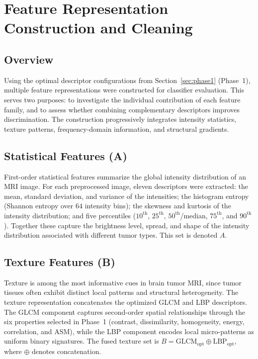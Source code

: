 \section{Feature Representation Construction and Cleaning}
\label{sec:features}

\subsection{Overview}

Using the optimal descriptor configurations from Section~\ref{sec:phase1}
(Phase~1), multiple feature representations were constructed for classifier
evaluation. This serves two purposes: to investigate the individual contribution
of each feature family, and to assess whether combining complementary descriptors
improves discrimination. The construction progressively integrates intensity
statistics, texture patterns, frequency-domain information, and structural
gradients.

\subsection{Statistical Features (A)}
\label{sec:feat_stats}

First-order statistical features summarize the global intensity distribution of
an MRI image. For each preprocessed image, eleven descriptors were extracted:
the mean, standard deviation, and variance of the intensities; the histogram
entropy (Shannon entropy over $64$ intensity bins); the skewness and kurtosis of
the intensity distribution; and five percentiles ($10^{\text{th}}$,
$25^{\text{th}}$, $50^{\text{th}}$/median, $75^{\text{th}}$, and
$90^{\text{th}}$). Together these capture the brightness level, spread, and shape
of the intensity distribution associated with different tumor types. This set is
denoted $A$.

\subsection{Texture Features (B)}
\label{sec:feat_texture}

Texture is among the most informative cues in brain tumor MRI, since tumor
tissues often exhibit distinct local patterns and structural heterogeneity. The
texture representation concatenates the optimized GLCM and LBP descriptors. The
GLCM component captures second-order spatial relationships through the six
properties selected in Phase~1 (contrast, dissimilarity, homogeneity, energy,
correlation, and ASM), while the LBP component encodes local micro-patterns as
uniform binary signatures. The fused texture set is $B = \mathrm{GLCM_{opt}}
\oplus \mathrm{LBP_{opt}}$, where $\oplus$ denotes concatenation.

